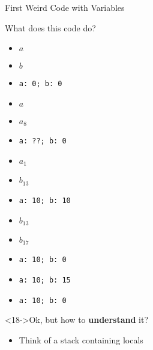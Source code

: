 \begin{Coupe}
\begin{frame}{First Weird Code with Variables}
\begin{minipage}{.5\linewidth}
    \begin{block}{What does this code do?}\medskip
      \begin{minipage}{.5\linewidth}
        \begin{itemize}
        \item<2->[l1] $a$ 
        \item<3->[l3] $b$ 
        \item<6->[l5] \texttt{a:~0; b:~0}
        \item<7->[l6] $a$ 
        \item<8->[l8] $a_8$ 
        \item<9->[l9] \texttt{a:~??;~b:~0}
        \item<10->[l11] $a_1$ 
        \end{itemize}        
      \end{minipage}%
      \begin{minipage}{.5\linewidth}
        \begin{itemize}
        \item<11->[l13] $b_{13}$ 
        \item<12->[l14] \texttt{a:~10;~b:~10}
        \item<13->[l15] $b_{13}$ 
        \item<14->[l17] $b_{17}$ 
        \item<15->[l18] \texttt{a:~10;~b:~0}
        \item<16->[l20] \texttt{a:~10;~b:~15}
        \item<17->[l22] \texttt{a:~10;~b:~0}
        \end{itemize}
      \end{minipage}
    \end{block}\vspace{-.4\baselineskip}
    \begin{alertblock}<18->{Ok, but how to \textbf{understand} it?}
      \begin{itemize}\vspace{-\baselineskip}
      \item<19-> Think of a stack containing locals
      \end{itemize}
    \end{alertblock}
  \end{minipage}
\end{frame}

\end{Coupe}
